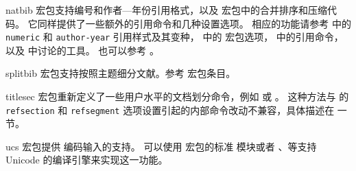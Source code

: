\begin{marglist}
\item[natbib]
 宏包支持编号和作者---年份引用格式，以及  宏包中的合并排序和压缩代码。
它同样提供了一些额外的引用命令和几种设置选项。
相应的功能请参考  中的 \texttt{numeric} 和 \texttt{author-year} 引用样式及其变种，
中的  宏包选项， 中的引用命令，
以及  中讨论的工具。
也可以参考 。

\item[splitbib]
 宏包支持按照主题细分文献。参考  宏包条目。

\item[titlesec]
 宏包重新定义了一些用户水平的文档划分命令，例如  或 。
这种方法与 \biblatex 的 \texttt{refsection} 和 \texttt{refsegment} 选项设置引起的内部命令改动不兼容，具体描述在  一节。

\item[ucs]
 宏包提供 \utf 编码输入的支持。
可以使用  宏包的标准  模块或者 \XeTeX 、\LuaTeX 等支持 Unicode 的编译引擎来实现这一功能。

\end{marglist}

